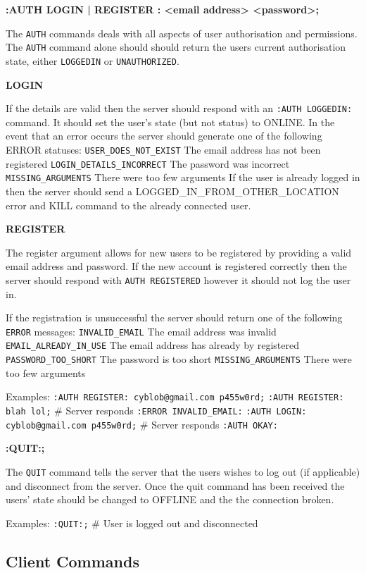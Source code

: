 {\bf :AUTH { LOGIN | REGISTER }: <email address> <password>;}

The \texttt{AUTH} commands deals with all aspects of user authorisation and permissions. The \texttt{AUTH} command alone should should return the users current authorisation state, either \texttt{LOGGEDIN} or \texttt{UNAUTHORIZED}.

{\bf LOGIN}

If the details are valid then the server should respond with an \texttt{:AUTH LOGGEDIN:} command. It should set the user’s state (but not status) to ONLINE.
In the event that an error occurs the server should generate one of the following ERROR statuses:
	\texttt{USER_DOES_NOT_EXIST}		The email address has not been registered
	\texttt{LOGIN_DETAILS_INCORRECT}	The password was incorrect
\texttt{MISSING_ARGUMENTS}		There were too few arguments
If the user is already logged in then the server should send a LOGGED_IN_FROM_OTHER_LOCATION error and KILL command to the already connected user.

{\bf REGISTER}

The register argument allows for new users to be registered by providing a valid email address and password. If the new account is registered correctly then the server should respond with \texttt{AUTH REGISTERED} however it should not log the user in. 

If the registration is unsuccessful the server should return one of the following \texttt{ERROR} messages:
	\texttt{INVALID_EMAIL}				The email address was invalid
	\texttt{EMAIL_ALREADY_IN_USE}		The email address has already by registered
\texttt{PASSWORD_TOO_SHORT}		The password is too short
\texttt{MISSING_ARGUMENTS}		There were too few arguments

Examples:
\texttt{:AUTH REGISTER: cyblob@gmail.com p455w0rd;}
\texttt{:AUTH REGISTER: blah lol;}		# Server responds \texttt{:ERROR INVALID_EMAIL:}
\texttt{:AUTH LOGIN: cyblob@gmail.com p455w0rd;}	# Server responds \texttt{:AUTH OKAY:}

{\bf :QUIT:;}

The \texttt{QUIT} command tells the server that the users wishes to log out (if applicable) and disconnect from the server. Once the quit command has been received the users’ state should be changed to OFFLINE and the the connection broken.

Examples:
\texttt{:QUIT:;}					# User is logged out and disconnected

\subsection{Client Commands}

